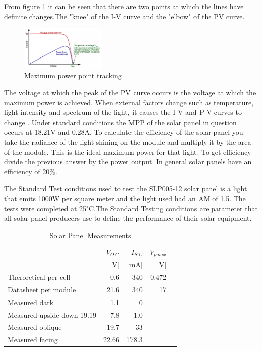 \label{sec:MPPT}
From figure \ref{fig:mppt} it can be seen that there are two points at which the lines have definite changes.The "knee" of the I-V curve and the "elbow" of the PV curve. 
\begin{figure}
\centering
\includegraphics[width=0.36\textwidth]{Figures/MPPT.png}
\caption[{Maximum power point tracking }]{Maximum power point tracking \cite{MPPT}}
\label{fig:mppt}
\end{figure}
The voltage at which the peak of the PV curve occurs is the voltage at which the maximum power is achieved. When external factors change such as temperature, light intensity and spectrum of the light, it causes the I-V and P-V curves to change \cite{vidmppt}. Under standard conditions the MPP of the solar panel in question occurs at 18.21V and 0.28A. To calculate the efficiency of the solar panel you take the radiance of the light shining on the module and multiply it by the area of the module. This is the ideal maximum power for that light. To get efficiency divide the previous answer by the power output. In general solar panels have an efficiency of 20\%\cite{eff}. 



\label{sec:STC}
The Standard Test conditions used to test the SLP005-12 solar panel is a light that emits 1000W per square meter and the light used had an AM of 1.5. The tests were completed at 25$^{\circ}$C.The Standard Testing conditions are parameter that all solar panel producers use to define the performance of their solar equipment.





\begin{table}[!htb]
        \centering
        \footnotesize
        \caption{Solar Panel Measurements}
         \begin{tabular}{lrrrr}
          \toprule
             & $V_{O.C}$ & $I_{S.C}$ & $V_{pmax}$ \\
             &  [V]  & [mA] & [V]\\
          \midrule
          Theroretical per cell & 0.6      & 340 & 0.472 \\
          Datasheet  per module &  21.6      & 340 & 17 \\
          Measured dark       & 1.1 & 0 \\
          Measured upside-down  19.19      & 7.8 & 1.0 \\
          Measured oblique       & 19.7 & 33 \\
          Measured facing        & 22.66 & 178.3 \\
          \bottomrule
        \end{tabular}
     \label{tab:PVresults}
\end{table}


